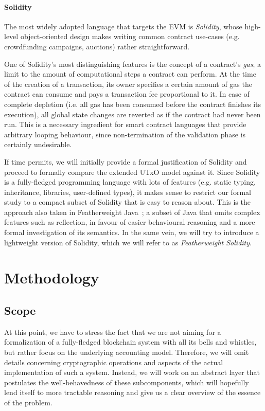 \documentclass[acmsmall,nonacm=true,screen=true]{acmart}
\begin{document}
\paragraph{Solidity}
The most widely adopted language that targets the EVM is \textit{Solidity},
whose high-level object-oriented design makes writing common contract use-cases (e.g. crowdfunding campaigns, auctions)
rather straightforward.

One of Solidity's most distinguishing features is the concept of a contract's \textit{gas}; a limit to the amount
of computational steps a contract can perform.
At the time of the creation of a transaction, its owner specifies a certain amount of gas the contract can consume and
pays a transaction fee proportional to it. In case of complete depletion (i.e. all gas has been consumed before the contract
finishes its execution), all global state changes are reverted as if the contract had never been run.
This is a necessary ingredient for smart contract languages that provide
arbitrary looping behaviour, since non-termination of the validation phase is certainly undesirable.

If time permits, we will initially provide a formal justification of Solidity and proceed to
formally compare the extended UTxO model against it.
Since Solidity is a fully-fledged programming language with lots of features
(e.g. static typing, inheritance, libraries, user-defined types), it makes sense to 
restrict our formal study to a compact subset of Solidity that is easy to reason about.
This is the approach also taken in Featherweight Java~\cite{featherweightjava}; a subset
of Java that omits complex features such as reflection, in favour of easier behavioural reasoning
and a more formal investigation of its semantics.
In the same vein, we will try to introduce a lightweight version of Solidity, which we will refer to as
\textit{Featherweight Solidity}.

\section{Methodology}
\label{sec:methodology}

\subsection{Scope}
At this point, we have to stress the fact that we are not aiming for a formalization of a fully-fledged 
blockchain system with all its bells and whistles, but rather focus on the underlying accounting model.
Therefore, we will omit details concerning cryptographic operations and aspects of the actual implementation
of such a system. Instead, we will work on an abstract layer that postulates the well-behavedness of these
subcomponents, which will hopefully lend itself to more tractable reasoning and
give us a clear overview of the essence of the problem.
\end{document}
